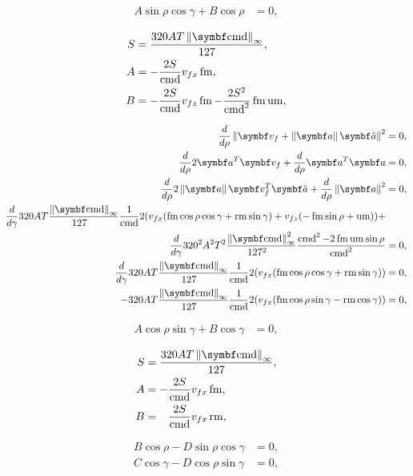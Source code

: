 \begin{align*}
A\sin\rho\cos\gamma + B\cos\rho &= 0,
\end{align*}

\begin{align*}
S &= \frac{320AT\norm{\vec{\cmd}}_{\infty}}{127},\\
A &= -\frac{2S}{\cmd}v_{fx}\fmove,\\
B &= -\frac{2S}{\cmd}v_{fz}\fmove - \frac{2S^2}{\cmd^2}\fmove\umove,
\end{align*}

\begin{align*}
\frac{d}{d\rho}\norm{\vec{v}_f + \norm{\vec{a}}\uvec{a}}^2 &= 0,\\
\frac{d}{d\rho}2\vec{a}^T \vec{v}_f + \frac{d}{d\rho}\vec{a}^T \vec{a} &= 0,\\
\frac{d}{d\rho}2\norm{\vec{a}} \vec{v}_f^T \uvec{a} + \frac{d}{d\rho}\norm{\vec{a}}^2 &= 0,\\
\frac{d}{d\gamma}320AT\frac{\norm{\vec{\cmd}}_{\infty}}{127\hphantom{_{\infty}}} \frac{1}{\cmd}2 (v_{fx}(\fmove \cos\rho\cos\gamma + \rmove \sin\gamma) + v_{fz}(-\fmove \sin\rho + \umove) ) +\\
\frac{d}{d\gamma}320^2 A^2 T^2\frac{\norm{\vec{\cmd}}^2_{\infty}}{127^2\hphantom{_{\infty}}} \frac{\cmd^2  - 2\fmove\umove\sin\rho}{\cmd^2} &= 0,\\
%
\frac{d}{d\gamma}320AT\frac{\norm{\vec{\cmd}}_{\infty}}{127\hphantom{_{\infty}}} \frac{1}{\cmd}2 (v_{fx}(\fmove \cos\rho\cos\gamma + \rmove \sin\gamma)) &= 0,\\
-320AT\frac{\norm{\vec{\cmd}}_{\infty}}{127\hphantom{_{\infty}}} \frac{1}{\cmd}2 (v_{fx}(\fmove \cos\rho\sin\gamma - \rmove \cos\gamma)) &= 0,
\end{align*}

\begin{align*}
A\cos\rho\sin\gamma + B\cos\gamma &= 0,
\end{align*}

\begin{align*}
S &= \frac{320AT\norm{\vec{\cmd}}_{\infty}}{127},\\
A &= -\frac{2S}{\cmd}v_{fx}\fmove,\\
B &= \hphantom{-}\frac{2S}{\cmd}v_{fx}\rmove,
\end{align*}

\begin{align*}
B\cos\rho - D\sin\rho\cos\gamma &= 0,\\
C\cos\gamma - D\cos\rho\sin\gamma &= 0,
\end{align*}


